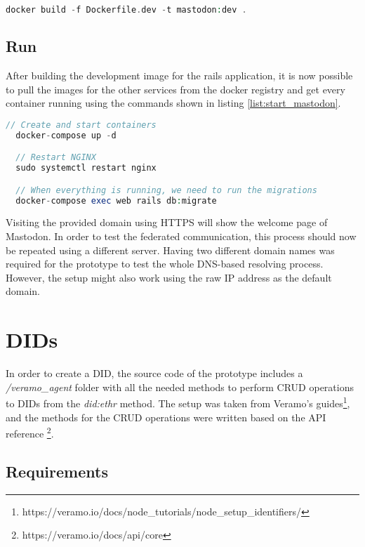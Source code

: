 \lstset{style=CodeStyle}
  \begin{lstlisting}[language=PHP, caption=Building the development Dockerfile, float=h]
    docker build -f Dockerfile.dev -t mastodon:dev .
  \end{lstlisting}


\subsection{Run}
After building the development image for the rails application, it is now possible to pull the images for the other services from the docker registry and get every container running using the commands shown in listing \ref{list:start_mastodon}.

\lstset{style=CodeStyle}
\begin{lstlisting}[language=PHP, caption=Starting all services of Mastodon, label=list:start_mastodon, float=ht]
  // Create and start containers
  docker-compose up -d

  // Restart NGINX
  sudo systemctl restart nginx

  // When everything is running, we need to run the migrations
  docker-compose exec web rails db:migrate
\end{lstlisting}


Visiting the provided domain using HTTPS will show the welcome page of Mastodon. In order to test the federated communication, this process should now be repeated using a different server. Having two different domain names was required for the prototype to test the whole DNS-based resolving process. However, the setup might also work using the raw IP address as the default domain. 


\section{DIDs}

In order to create a DID, the source code of the prototype includes a \emph{/veramo\_agent} folder with all the needed methods to perform CRUD operations to DIDs from the \emph{did:ethr} method. The setup was taken from Veramo's guides\footnote{https://veramo.io/docs/node\_tutorials/node\_setup\_identifiers/}, and the methods for the CRUD operations were written based on the API reference \footnote{https://veramo.io/docs/api/core}. 

\subsection{Requirements}

